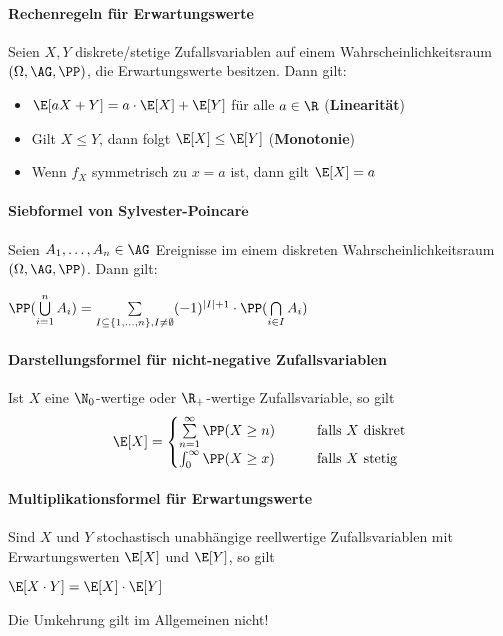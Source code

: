 \paragraph{Rechenregeln für Erwartungswerte}
Seien $X,Y$ diskrete/stetige Zufallsvariablen auf einem Wahrscheinlichkeitsraum $(\Omega,\AG,\PP)$, die Erwartungswerte besitzen.
Dann gilt:
\begin{itemize}
	\item $\E[aX+Y]=a\cdot\E[X]+\E[Y]$ für alle $a\in\R$ (\textbf{Linearität})
	\item Gilt $X\leq Y$, dann folgt $\E[X]\leq\E[Y]$ (\textbf{Monotonie})
	\item Wenn $f_X$ symmetrisch zu $x=a$ ist, dann gilt $\E[X]=a$
\end{itemize}

\paragraph{Siebformel von Sylvester-Poincar$\boldsymbol{\acute{e}}$}
Seien $A_1,\ldots,A_n\in\AG$ Ereignisse im einem diskreten Wahrscheinlichkeitsraum $(\Omega,\AG,\PP)$.
Dann gilt:
\begin{tightcenter}
	$\PP(\bigcup\limits_{i=1}^{n}A_i)=\sum\limits_{I\subseteq\{1,\ldots,n\}, I\neq\emptyset}(-1)^{|I|+1}\cdot\PP(\bigcap\limits_{i\in I}A_i)$
\end{tightcenter}

\paragraph{Darstellungsformel für nicht-negative Zufallsvariablen}
Ist $X$ eine $\N_0$-wertige oder $\R_+$-wertige Zufallsvariable, so gilt
\[   
\E[X]=
\begin{cases}
	\sum\limits_{n=1}^{\infty}\PP(X\geq n) & \qquad\text{falls $X$ diskret}\\
	\int_{0}^{\infty}\PP(X\geq x) & \qquad\text{falls $X$ stetig}
\end{cases}
\]

\paragraph{Multiplikationsformel für Erwartungswerte}
Sind $X$ und $Y$ stochastisch unabhängige reellwertige Zufallsvariablen mit Erwartungswerten $\E[X]$ und $\E[Y]$, so gilt
\begin{tightcenter}
	$\E[X\cdot Y]=\E[X]\cdot\E[Y]$
\end{tightcenter}
Die Umkehrung gilt im Allgemeinen nicht!

